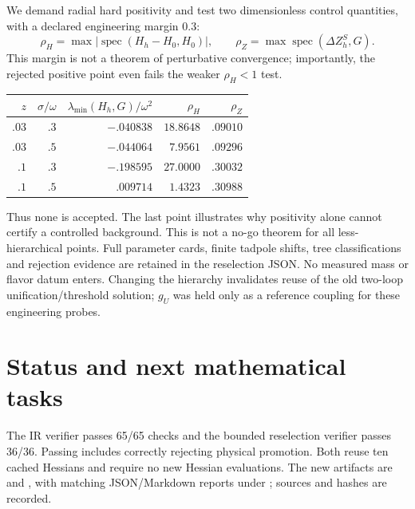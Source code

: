 \documentclass[11pt]{article}
\begin{document}
We demand radial hard positivity and test two dimensionless control
quantities, with a declared engineering margin $0.3$:
\begin{equation}
 \rho_H=\max|\operatorname{spec}(H_h-H_0,H_0)|,
 \qquad \rho_Z=\max\operatorname{spec}(\Delta Z_h^S,G).
\end{equation}
This margin is not a theorem of perturbative convergence; importantly,
the rejected positive point even fails the weaker $\rho_H<1$ test.
\begin{center}
\begin{tabular}{rrrrr}
\toprule
$z$ & $\sigma/\omega$ & $\lambda_{\min}(H_h,G)/\omega^2$ & $\rho_H$ & $\rho_Z$\\
\midrule
$.03$ & $.3$ & $-.040838$ & $18.8648$ & $.09010$\\
$.03$ & $.5$ & $-.044064$ & $7.9561$ & $.09296$\\
$.1$ & $.3$ & $-.198595$ & $27.0000$ & $.30032$\\
$.1$ & $.5$ & $.009714$ & $1.4323$ & $.30988$\\
\bottomrule
\end{tabular}
\end{center}
Thus none is accepted. The last point illustrates why positivity alone
cannot certify a controlled background. This is not a no-go theorem
for all less-hierarchical points. Full parameter cards, finite tadpole
shifts, tree classifications and rejection evidence are retained in
the reselection JSON. No measured mass or flavor datum enters.
Changing the hierarchy invalidates reuse of the old two-loop
unification/threshold solution; $g_U$ was held only as a reference
coupling for these engineering probes.

\section{Status and next mathematical tasks}
The IR verifier passes 65/65 checks and the bounded reselection verifier
passes 36/36. Passing includes correctly rejecting physical promotion.
Both reuse ten cached Hessians and require no new Hessian evaluations.
The new artifacts are  and
, with matching JSON/Markdown
reports under ; sources and hashes are recorded.
\end{document}
